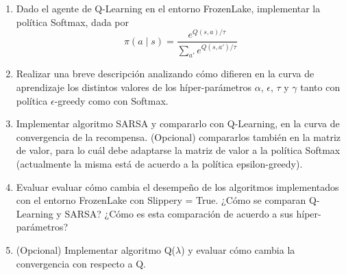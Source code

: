 \documentclass[11pt]{article}
\begin{document}
\begin{enumerate}
\def\labelenumi{\arabic{enumi}.}
\item
  Dado el agente de Q-Learning en el entorno FrozenLake, implementar la
  política Softmax, dada por
  \[\pi(a \mid s) = \frac{e^{Q(s,a)/\tau}}{\sum_{a'}e^{Q(s,a')/\tau}}\]
\item
  Realizar una breve descripción analizando cómo difieren en la curva de
  aprendizaje los distintos valores de los híper-parámetros \(\alpha\),
  \(\epsilon\), \(\tau\) y \(\gamma\) tanto con política
  \(\epsilon\)-greedy como con Softmax.
\item
  Implementar algoritmo SARSA y compararlo con Q-Learning, en la curva
  de convergencia de la recompensa. (Opcional) compararlos también en la
  matriz de valor, para lo cuál debe adaptarse la matriz de valor a la
  política Softmax (actualmente la misma está de acuerdo a la política
  epsilon-greedy).
\item
  Evaluar evaluar cómo cambia el desempeño de los algoritmos
  implementados con el entorno FrozenLake con Slippery = True. ¿Cómo se
  comparan Q-Learning y SARSA? ¿Cómo es esta comparación de acuerdo a
  sus híper-parámetros?
\item
  (Opcional) Implementar algoritmo Q(\(\lambda\)) y evaluar cómo cambia
  la convergencia con respecto a Q.
\end{enumerate}


    
    
    
    
\end{document}
